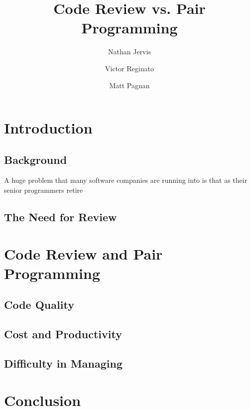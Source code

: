 \documentclass{article}
\title{Code Review vs. Pair Programming}
\author{Nathan Jervis \and Victor Reginato \and Matt Pagnan}
\begin{document}
\maketitle

\section{Introduction}

\subsection{Background}
A huge problem that many software companies are running into is that as their senior programmers retire  

\subsection{The Need for Review}

\section{Code Review and Pair Programming}

\subsection{Code Quality}

\subsection{Cost and Productivity}

\subsection{Difficulty in Managing}

\section{Conclusion}
\end{document}
